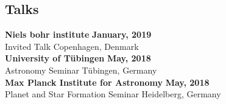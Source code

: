 \documentclass[margin,line]{res}
\begin{document}
\begin{resume}
		\section{\sc Talks}
		{\bf Niels bohr institute} \hfill {\bf January, 2019}\\
		Invited Talk \hfill Copenhagen, Denmark\\
		{\bf University of T\"ubingen} \hfill {\bf May, 2018}\\
		Astronomy Seminar \hfill T\"ubingen, Germany\\
		{\bf Max Planck Institute for Astronomy} \hfill {\bf May, 2018}\\
		Planet and Star Formation Seminar \hfill Heidelberg, Germany\\

\end{resume}
\end{document}
